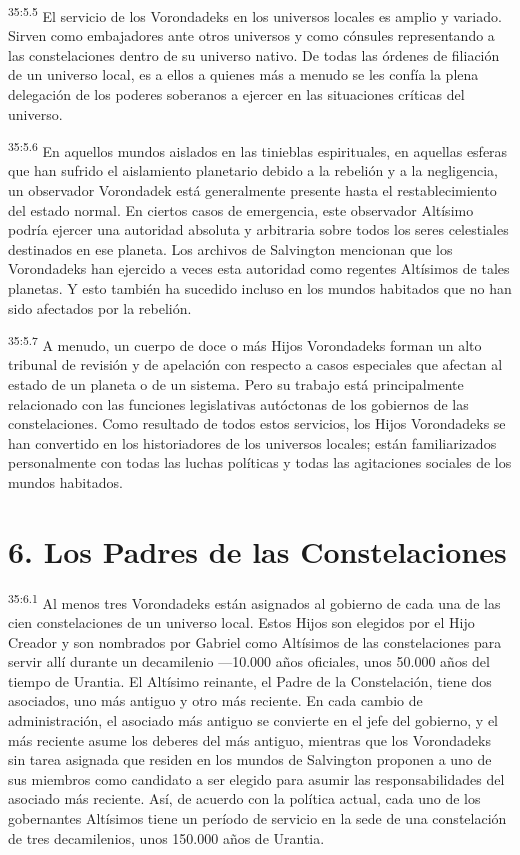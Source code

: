\par
\textsuperscript{35:5.5} El servicio de los Vorondadeks en los universos locales es amplio y variado. Sirven como embajadores ante otros universos y como cónsules representando a las constelaciones dentro de su universo nativo. De todas las órdenes de filiación de un universo local, es a ellos a quienes más a menudo se les confía la plena delegación de los poderes soberanos a ejercer en las situaciones críticas del universo.

\par
\textsuperscript{35:5.6} En aquellos mundos aislados en las tinieblas espirituales, en aquellas esferas que han sufrido el aislamiento planetario debido a la rebelión y a la negligencia, un observador Vorondadek está generalmente presente hasta el restablecimiento del estado normal. En ciertos casos de emergencia, este observador Altísimo podría ejercer una autoridad absoluta y arbitraria sobre todos los seres celestiales destinados en ese planeta. Los archivos de Salvington mencionan que los Vorondadeks han ejercido a veces esta autoridad como regentes Altísimos de tales planetas. Y esto también ha sucedido incluso en los mundos habitados que no han sido afectados por la rebelión.

\par
\textsuperscript{35:5.7} A menudo, un cuerpo de doce o más Hijos Vorondadeks forman un alto tribunal de revisión y de apelación con respecto a casos especiales que afectan al estado de un planeta o de un sistema. Pero su trabajo está principalmente relacionado con las funciones legislativas autóctonas de los gobiernos de las constelaciones. Como resultado de todos estos servicios, los Hijos Vorondadeks se han convertido en los historiadores de los universos locales; están familiarizados personalmente con todas las luchas políticas y todas las agitaciones sociales de los mundos habitados.

\section*{6. Los Padres de las Constelaciones}
\par
\textsuperscript{35:6.1} Al menos tres Vorondadeks están asignados al gobierno de cada una de las cien constelaciones de un universo local. Estos Hijos son elegidos por el Hijo Creador y son nombrados por Gabriel como Altísimos de las constelaciones para servir allí durante un decamilenio ---10.000 años oficiales, unos 50.000 años del tiempo de Urantia. El Altísimo reinante, el Padre de la Constelación, tiene dos asociados, uno más antiguo y otro más reciente. En cada cambio de administración, el asociado más antiguo se convierte en el jefe del gobierno, y el más reciente asume los deberes del más antiguo, mientras que los Vorondadeks sin tarea asignada que residen en los mundos de Salvington proponen a uno de sus miembros como candidato a ser elegido para asumir las responsabilidades del asociado más reciente. Así, de acuerdo con la política actual, cada uno de los gobernantes Altísimos tiene un período de servicio en la sede de una constelación de tres decamilenios, unos 150.000 años de Urantia.

